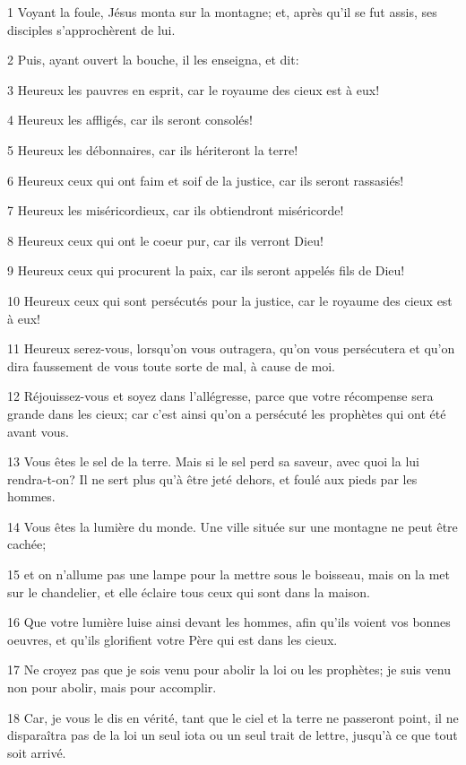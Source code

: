 \par 1 Voyant la foule, Jésus monta sur la montagne; et, après qu'il se fut assis, ses disciples s'approchèrent de lui.
\par 2 Puis, ayant ouvert la bouche, il les enseigna, et dit:
\par 3 Heureux les pauvres en esprit, car le royaume des cieux est à eux!
\par 4 Heureux les affligés, car ils seront consolés!
\par 5 Heureux les débonnaires, car ils hériteront la terre!
\par 6 Heureux ceux qui ont faim et soif de la justice, car ils seront rassasiés!
\par 7 Heureux les miséricordieux, car ils obtiendront miséricorde!
\par 8 Heureux ceux qui ont le coeur pur, car ils verront Dieu!
\par 9 Heureux ceux qui procurent la paix, car ils seront appelés fils de Dieu!
\par 10 Heureux ceux qui sont persécutés pour la justice, car le royaume des cieux est à eux!
\par 11 Heureux serez-vous, lorsqu'on vous outragera, qu'on vous persécutera et qu'on dira faussement de vous toute sorte de mal, à cause de moi.
\par 12 Réjouissez-vous et soyez dans l'allégresse, parce que votre récompense sera grande dans les cieux; car c'est ainsi qu'on a persécuté les prophètes qui ont été avant vous.
\par 13 Vous êtes le sel de la terre. Mais si le sel perd sa saveur, avec quoi la lui rendra-t-on? Il ne sert plus qu'à être jeté dehors, et foulé aux pieds par les hommes.
\par 14 Vous êtes la lumière du monde. Une ville située sur une montagne ne peut être cachée;
\par 15 et on n'allume pas une lampe pour la mettre sous le boisseau, mais on la met sur le chandelier, et elle éclaire tous ceux qui sont dans la maison.
\par 16 Que votre lumière luise ainsi devant les hommes, afin qu'ils voient vos bonnes oeuvres, et qu'ils glorifient votre Père qui est dans les cieux.
\par 17 Ne croyez pas que je sois venu pour abolir la loi ou les prophètes; je suis venu non pour abolir, mais pour accomplir.
\par 18 Car, je vous le dis en vérité, tant que le ciel et la terre ne passeront point, il ne disparaîtra pas de la loi un seul iota ou un seul trait de lettre, jusqu'à ce que tout soit arrivé.
